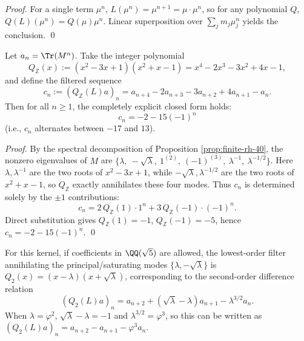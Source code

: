 \begin{proof}
For a single term \(\mu^n\), \(L(\mu^n)=\mu^{n+1}=\mu\cdot \mu^n\), so for any polynomial \(Q\), \(Q(L)(\mu^n)=Q(\mu)\mu^n\).
Linear superposition over \(\sum_j m_j\mu_j^n\) yields the conclusion. \qed
\end{proof}
\begin{corollary}\label{cor:real-input-40-spectral-annihilation-filter}
Let \(a_n=\Tr(M^n)\).
Take the integer polynomial
\[
Q_{\mathbb{Z}}(x):=(x^2-3x+1)(x^2+x-1)=x^4-2x^3-3x^2+4x-1,
\]
and define the filtered sequence
\[
c_n:=(Q_{\mathbb{Z}}(L)a)_n
=a_{n+4}-2a_{n+3}-3a_{n+2}+4a_{n+1}-a_n.
\]
Then for all \(n\ge 1\), the completely explicit closed form holds:
\[
\boxed{\;c_n=-2-15(-1)^n\;}
\]
(i.e., \(c_n\) alternates between \(-17\) and \(13\)).
\end{corollary}
\begin{proof}
By the spectral decomposition of Proposition \ref{prop:finite-rh-40}, the nonzero eigenvalues of \(M\) are
\(\{\lambda,\ -\sqrt{\lambda},\ 1^{(2)},\ (-1)^{(3)},\ \lambda^{-1},\ \lambda^{-1/2}\}\).
Here
\(\lambda,\lambda^{-1}\)
are the two roots of \(x^2-3x+1\), while
\(-\sqrt{\lambda},\lambda^{-1/2}\)
are the two roots of \(x^2+x-1\), so \(Q_{\mathbb{Z}}\) exactly annihilates these four modes.
Thus \(c_n\) is determined solely by the \(\pm 1\) contributions:
\[
c_n=2\,Q_{\mathbb{Z}}(1)\cdot 1^n+3\,Q_{\mathbb{Z}}(-1)\cdot (-1)^n.
\]
Direct substitution gives \(Q_{\mathbb{Z}}(1)=-1\), \(Q_{\mathbb{Z}}(-1)=-5\), hence
\(
c_n=-2-15(-1)^n
\).
\qed
\end{proof}
\begin{remark}\label{rem:real-input-40-spectral-annihilation-filter-q2}
For this kernel, if coefficients in \(\QQ(\sqrt5)\) are allowed, the lowest-order filter annihilating the principal/saturating modes \(\{\lambda,-\sqrt{\lambda}\}\) is
\(
Q_2(x)=(x-\lambda)(x+\sqrt{\lambda})
\),
corresponding to the second-order difference relation
\[
(Q_2(L)a)_n=a_{n+2}+(\sqrt{\lambda}-\lambda)a_{n+1}-\lambda^{3/2}a_n.
\]
When \(\lambda=\varphi^2\), \(\sqrt{\lambda}-\lambda=-1\) and \(\lambda^{3/2}=\varphi^3\), so this can be written as
\(
(Q_2(L)a)_n=a_{n+2}-a_{n+1}-\varphi^3 a_n
\).
\end{remark}
